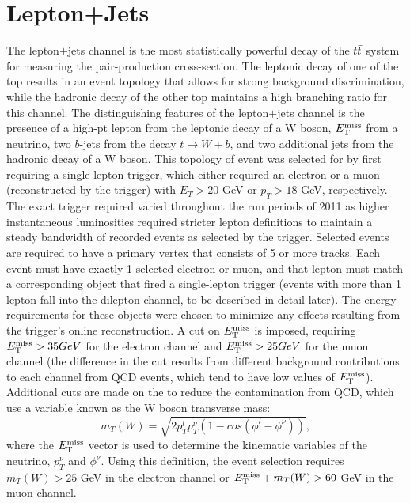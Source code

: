 
\section{Lepton+Jets}

The lepton$+$jets channel is the most statistically powerful decay of the $t\bar{t}$ system for measuring the pair-production cross-section.
The leptonic decay of one of the top results in an event topology that allows for strong background discrimination, while the hadronic decay of the other top maintains a high branching ratio for this channel.
The distinguishing features of the lepton$+$jets channel is the presence of a high-pt lepton from the leptonic decay of a W boson, $E_{\mathrm{T}}^{\mathrm{miss}}$ from a neutrino, two $b$-jets from the decay $t \rightarrow W+b$, and two additional jets from the hadronic decay of a W boson.
This topology of event was selected for by first requiring a single lepton trigger,
which either required an electron or a muon (reconstructed by the trigger) with $E_{T} > 20$ GeV or $p_{T} > 18$ GeV, respectively.
The exact trigger required varied throughout the run periods of 2011 as higher instantaneous luminosities required stricter lepton definitions to maintain a steady bandwidth of recorded events as selected by the trigger.
Selected events are required to have a primary vertex that consists of 5 or more tracks.
Each event must have exactly 1 selected electron or muon, and that lepton must match a corresponding object that fired a single-lepton trigger (events with more than 1 lepton fall into the dilepton channel, to be described in detail later).
The energy requirements for these objects were chosen to minimize any effects resulting from the trigger's online reconstruction.
A cut on $E_{\mathrm{T}}^{\mathrm{miss}}$ is imposed, requiring $E_{\mathrm{T}}^{\mathrm{miss}} > 35 GeV$ for the electron channel and $E_{\mathrm{T}}^{\mathrm{miss}} > 25 GeV$ for the muon channel (the difference in the cut results from different background contributions to each channel from QCD events, which tend to have low values of $E_{\mathrm{T}}^{\mathrm{miss}}$).
Additional cuts are made on the to reduce the contamination from QCD, which use a variable known as the W boson transverse mass:
\begin{equation}
  m_{T}(W) = \sqrt{2 p_{T}^{l} p_{T}^{\nu} (1 - cos( \phi^{l} - \phi^{\nu}))},
\end{equation} 
where the $E_{\mathrm{T}}^{\mathrm{miss}}$ vector is used to determine the kinematic variables of the neutrino, $p_{T}^{\nu}$ and $\phi^{\nu}$.
Using this definition, the event selection requires $m_{T}(W) > 25$ GeV in the electron channel or $E_{\mathrm{T}}^{\mathrm{miss}} + m_{T}(W) > 60$ GeV in the muon channel.

